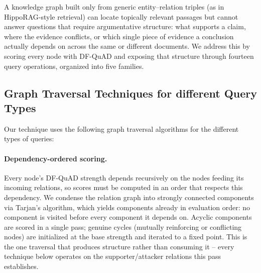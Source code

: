 \documentclass{article}
\begin{document}


A knowledge graph built only from generic entity--relation triples (as in
HippoRAG-style retrieval) can locate topically relevant passages but cannot
answer questions that require argumentative structure: what supports a
claim, where the evidence conflicts, or which single piece of evidence a
conclusion actually depends on across the same or different documents. We address this by scoring every node with
DF-QuAD and exposing that structure through fourteen query operations,
organized into five families.


\subsection{Graph Traversal Techniques for different Query Types}
Our technique uses the following graph traversal algorithms for the different types of queries:
\paragraph{Dependency-ordered scoring.} Every node's DF-QuAD strength depends
recursively on the nodes feeding its incoming relations, so scores must be
computed in an order that respects this dependency. We condense the
relation graph into strongly connected components via Tarjan's algorithm,
which yields components already in evaluation order: no component is
visited before every component it depends on. Acyclic components are scored
in a single pass; genuine cycles (mutually reinforcing or conflicting nodes)
are initialized at the base strength and iterated to a fixed point. This is
the one traversal that produces structure rather than consuming it -- every
technique below operates on the supporter/attacker relations this pass
establishes.
\end{document}
